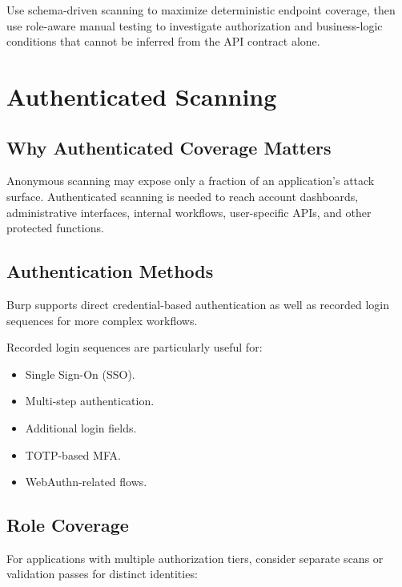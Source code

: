 \documentclass[11pt]{article}
\begin{document}
\begin{practicebox}
Use schema-driven scanning to maximize deterministic endpoint coverage, then use role-aware manual testing to investigate authorization and business-logic conditions that cannot be inferred from the API contract alone.
\end{practicebox}

\section{Authenticated Scanning}

\subsection{Why Authenticated Coverage Matters}

Anonymous scanning may expose only a fraction of an application's attack surface. Authenticated scanning is needed to reach account dashboards, administrative interfaces, internal workflows, user-specific APIs, and other protected functions.

\subsection{Authentication Methods}

Burp supports direct credential-based authentication as well as recorded login sequences for more complex workflows.

Recorded login sequences are particularly useful for:

\begin{itemize}
  \item Single Sign-On (SSO).
  \item Multi-step authentication.
  \item Additional login fields.
  \item TOTP-based MFA.
  \item WebAuthn-related flows.
\end{itemize}

\subsection{Role Coverage}

For applications with multiple authorization tiers, consider separate scans or validation passes for distinct identities:
\end{document}

